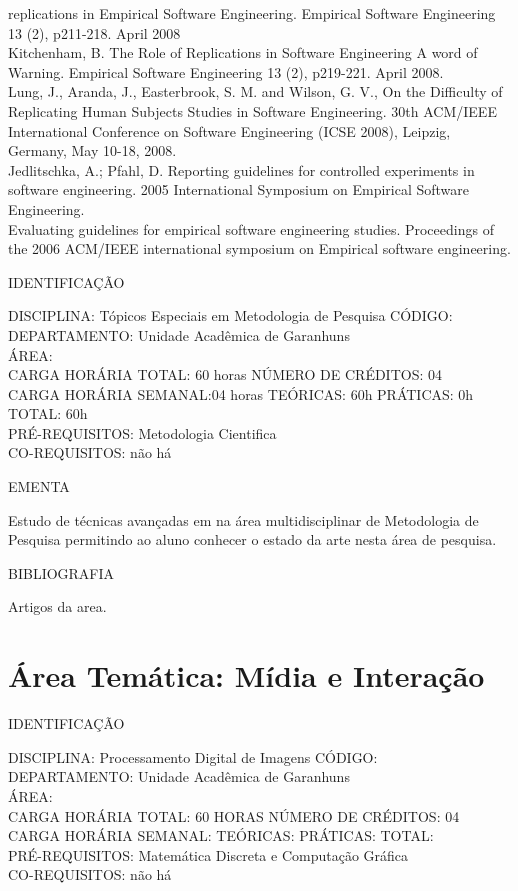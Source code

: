 \documentclass[
	12pt,				%
	openright,			%
  oneside,     %
	a4paper,			%
	english,			%
	french,				%
	spanish,			%
	brazil				%
	]{abntex2}
\begin{document}
\begin{apendicesenv}
replications in Empirical Software Engineering. Empirical Software
Engineering 13 (2), p211-218. April 2008 \\
Kitchenham, B. The Role of Replications in Software Engineering  A
word of Warning. Empirical Software Engineering 13 (2), p219-221. April
2008.\\
Lung, J., Aranda, J., Easterbrook, S. M. and Wilson, G. V., On the
Difficulty of Replicating Human Subjects Studies in Software
Engineering. 30th ACM/IEEE International Conference on Software
Engineering (ICSE 2008), Leipzig, Germany, May 10-18,
2008.\\
Jedlitschka, A.; Pfahl, D. Reporting guidelines for controlled
experiments in software engineering. 2005 International Symposium on
Empirical Software Engineering.\\
Evaluating guidelines for empirical software engineering studies.
Proceedings of the 2006 ACM/IEEE international symposium on Empirical
software engineering.

\newpage IDENTIFICAÇÃO

DISCIPLINA: Tópicos Especiais em Metodologia de Pesquisa CÓDIGO: \\
DEPARTAMENTO: Unidade Acadêmica de Garanhuns \\
ÁREA: \\
CARGA HORÁRIA TOTAL: 60 horas NÚMERO DE CRÉDITOS: 04\\
CARGA HORÁRIA SEMANAL:04 horas TEÓRICAS: 60h PRÁTICAS: 0h TOTAL: 60h\\
PRÉ-REQUISITOS: Metodologia Cientifica\\
CO-REQUISITOS: não há

EMENTA 

Estudo de técnicas avançadas em na área multidisciplinar de Metodologia
de Pesquisa permitindo ao aluno conhecer o estado da arte nesta área de
pesquisa.

BIBLIOGRAFIA 

Artigos da area.
\newpage

\section*{Área Temática: Mídia e Interação}

IDENTIFICAÇÃO

DISCIPLINA: Processamento Digital de Imagens CÓDIGO:\\ 
DEPARTAMENTO: Unidade Acadêmica de Garanhuns\\
ÁREA: \\
CARGA HORÁRIA TOTAL: 60 HORAS NÚMERO DE CRÉDITOS: 04\\
CARGA HORÁRIA SEMANAL: TEÓRICAS: PRÁTICAS: TOTAL: \\
PRÉ-REQUISITOS: Matemática Discreta e Computação Gráfica\\
CO-REQUISITOS: não há


\end{apendicesenv}
\end{document}
